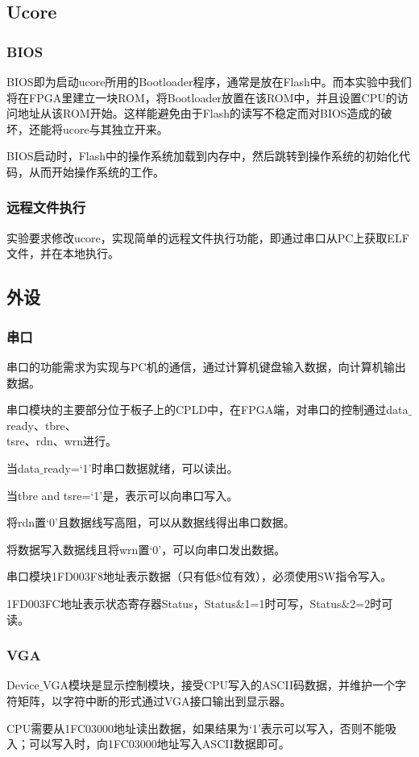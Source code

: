 \subsection{Ucore}
\subsubsection{BIOS}
BIOS即为启动ucore所用的Bootloader程序，通常是放在Flash中。而本实验中我们将在FPGA里建立一块ROM，将Bootloader放置在该ROM中，并且设置CPU的访问地址从该ROM开始。这样能避免由于Flash的读写不稳定而对BIOS造成的破坏，还能将ucore与其独立开来。

BIOS启动时，Flash中的操作系统加载到内存中，然后跳转到操作系统的初始化代码，从而开始操作系统的工作。
\subsubsection{远程文件执行}
实验要求修改ucore，实现简单的远程文件执行功能，即通过串口从PC上获取ELF文件，并在本地执行。
\subsection{外设}
\subsubsection{串口}
串口的功能需求为实现与PC机的通信，通过计算机键盘输入数据，向计算机输出数据。

串口模块的主要部分位于板子上的CPLD中，在FPGA端，对串口的控制通过data$\_$ready、tbre、\\
tsre、rdn、wrn进行。

当data$\_$ready=‘1’时串口数据就绪，可以读出。

当tbre and tsre=‘1’是，表示可以向串口写入。

将rdn置‘0’且数据线写高阻，可以从数据线得出串口数据。

将数据写入数据线且将wrn置‘0’，可以向串口发出数据。

串口模块1FD003F8地址表示数据（只有低8位有效），必须使用SW指令写入。

1FD003FC地址表示状态寄存器Status，Status$\&$1=1时可写，Status$\&$2=2时可读。
\subsubsection{VGA}
Device$\_$VGA模块是显示控制模块，接受CPU写入的ASCII码数据，并维护一个字符矩阵，以字符中断的形式通过VGA接口输出到显示器。

CPU需要从1FC03000地址读出数据，如果结果为‘1’表示可以写入，否则不能吸入；可以写入时，向1FC03000地址写入ASCII数据即可。
